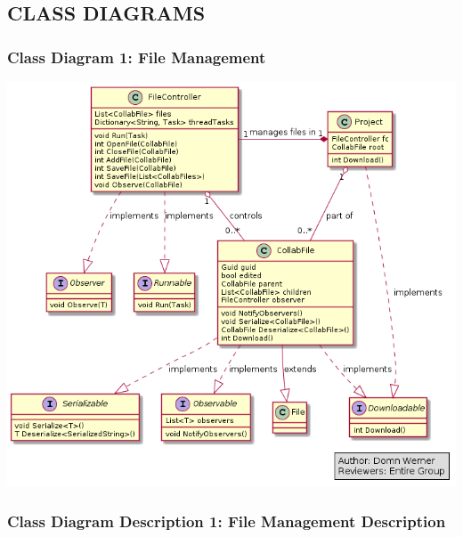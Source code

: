 \documentclass[twoside,letterpaper]{article}
\begin{document}
	\newpage



\subsection[CLASS DIAGRAMS]{\rmfamily\bfseries CLASS DIAGRAMS}
	\subsubsection[Class Diagram 1: File Management]{\rmfamily\bfseries\color{black}
		Class Diagram 1: File Management}
	\hypertarget{RefHeading22059017292}{}
	\bigskip
	
	\includegraphics[width=6.0in]{images/ClassDiagrams/FileManagement}
	
	\newpage
	
	\subsubsection[Class Diagram Description 1: File Management Description]{\rmfamily\bfseries\color{black}
		Class Diagram Description 1: File Management Description}
	\hypertarget{RefHeading22059017292}{}
	
\end{document}
